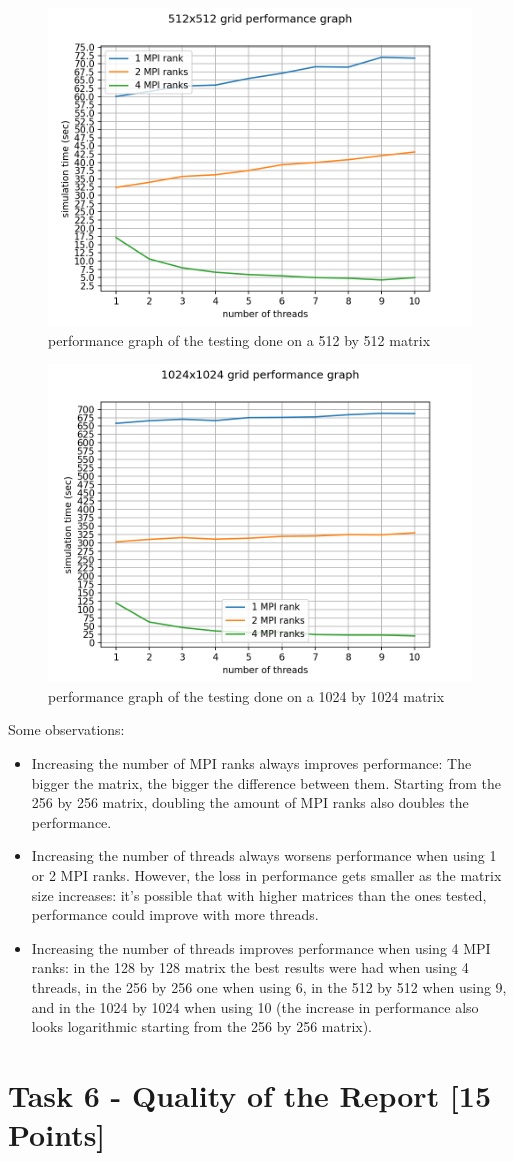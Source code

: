 \documentclass[unicode,11pt,a4paper,oneside,numbers=endperiod,openany]{scrartcl}
\begin{document}
\begin{figure}[H]
\centering
\includegraphics[width=0.9\linewidth]{512x512_plot.png}
\caption{performance graph of the testing done on a 512 by 512 matrix}
\end{figure}

\begin{figure}[H]
\centering
\includegraphics[width=0.9\linewidth]{1024x1024_plot.png}
\caption{performance graph of the testing done on a 1024 by 1024 matrix}
\end{figure}
Some observations:
\begin{itemize}
\item Increasing the number of MPI ranks always improves performance: The bigger the matrix, the bigger the difference between them. Starting from the 256 by 256 matrix, doubling the amount of MPI ranks also doubles the performance.
\item Increasing the number of threads always worsens performance when using 1 or 2 MPI ranks. However, the loss in performance gets smaller as the matrix size increases: it's possible that with higher matrices than the ones tested, performance could improve with more threads.
\item Increasing the number of threads improves performance when using 4 MPI ranks: in the 128 by 128 matrix the best results were had when using 4 threads, in the 256 by 256 one when using 6,  in the 512 by 512 when using 9, and in the 1024 by 1024 when using 10 (the increase in performance also looks logarithmic starting from the 256 by 256 matrix).
\end{itemize}

\section{Task 6 - Quality of the Report [15 Points]}
\end{document}

